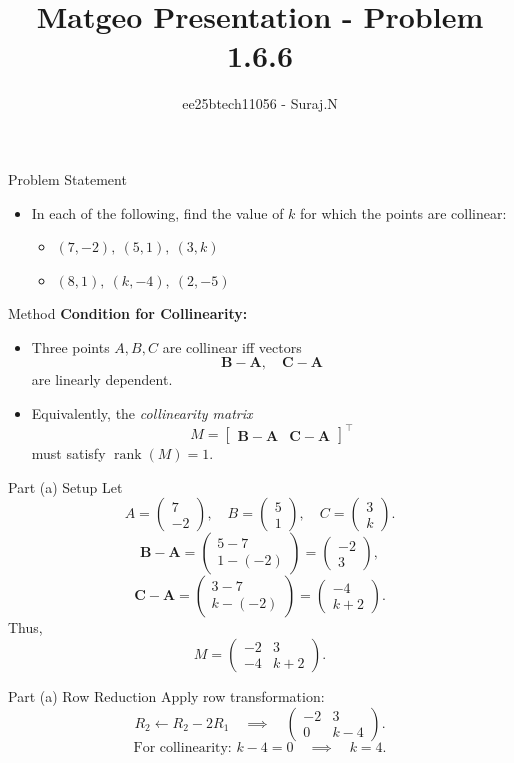 \documentclass{beamer}
\title{Matgeo Presentation - Problem 1.6.6}
\author{ee25btech11056 - Suraj.N}
\theoremstyle{remark}
\newcommand{\myvec}[1]{\ensuremath{\begin{pmatrix}#1\end{pmatrix}}}
\let\vec\mathbf
\numberwithin{equation}{section}
\begin{document}
\begin{frame}
  \titlepage
\end{frame}

\begin{frame}{Problem Statement}

\begin{itemize}
  \item In each of the following, find the value of $k$ for which the points are collinear:

\begin{itemize}
\item $(7,-2),\ (5,1),\ (3,k)$
\item $(8,1),\ (k,-4),\ (2,-5)$
\end{itemize}

\end{itemize}

\end{frame}

\begin{frame}{Method}
\textbf{Condition for Collinearity:}
\begin{itemize}
\item Three points $A,B,C$ are collinear iff vectors 
\[
\vec{B}-\vec{A}, \quad \vec{C}-\vec{A}
\]
are linearly dependent.
\item Equivalently, the \textit{collinearity matrix}
\[
M = \begin{bmatrix} \vec{B}-\vec{A} & \vec{C}-\vec{A} \end{bmatrix}^\top
\]
must satisfy $\operatorname{rank}(M)=1$.
\end{itemize}
\end{frame}

\begin{frame}{Part (a) Setup}
Let
\[
A=\myvec{7\\-2}, \quad B=\myvec{5\\1}, \quad C=\myvec{3\\k}.
\]
\[
\vec{B}-\vec{A} = \myvec{5-7\\ 1-(-2)} = \myvec{-2\\3},
\]
\[
\vec{C}-\vec{A} = \myvec{3-7\\ k-(-2)} = \myvec{-4\\k+2}.
\]
Thus,
\[
M = \myvec{-2 & 3\\ -4 & k+2}.
\]
\end{frame}

\begin{frame}{Part (a) Row Reduction}
Apply row transformation:
\[
R_2 \leftarrow R_2 - 2R_1 \quad \implies \quad
\myvec{-2 & 3\\ 0 & k-4}.
\]
\[
\text{For collinearity: } k-4=0 \quad \implies \quad k=\boxed{4}.
\]
\end{frame}
\end{document}
